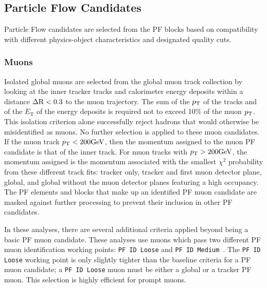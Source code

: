 \subsection{Particle Flow Candidates}
Particle Flow candidates are selected from the PF blocks based on compatibility with
different physics-object characteristics and designated quality cuts.


\subsubsection{Muons}
Isolated global muons are selected from the global muon track collection by looking at the inner
tracker tracks and calorimeter 
energy deposits within a distance $\Delta \mathrm{R} < 0.3$ to the muon trajectory. 
The sum of the $p_\mathrm{T}$ of the tracks and of the $E_{\text{T}}$ of the energy deposits is required not to 
exceed 10\% of the muon $p_\mathrm{T}$. This isolation criterion alone successfully reject hadrons that would
otherwise be misidentified as muons. No further selection is applied to these muon candidates.
If the muon track $p_\mathrm{T} < 200\mathrm{GeV}$, then the momentum assigned to the muon PF candidate is that of 
the inner track. For muon tracks with $p_\mathrm{T} > 200\mathrm{GeV}$, the momentum assigned is the momentum associated
with the smallest $\chi^2$ probability from these different track fits: tracker only, tracker and 
first muon detector plane, global, and global without the muon detector planes featuring a high occupancy.
The PF elements and blocks that make up an identified PF muon candidate are masked against further processing
to prevent their inclusion in other PF candidates.

In these analyses, there are several additional criteria applied beyond 
being a basic PF muon candidate. These analyses use muons which pass two different PF muon identification working
points: \texttt{PF ID Loose} and \texttt{PF ID Medium}~\cite{sm-htt-2017}. The \texttt{PF ID Loose}
working point is only slightly tighter than the baseline criteria for a PF muon candidate; 
a \texttt{PF ID Loose} muon must be either a global or a tracker PF muon. This selection is highly efficient
for prompt muons.

